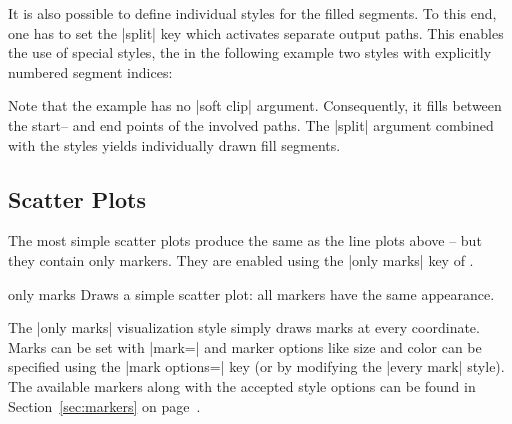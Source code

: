 {{It is also possible to define individual styles for the filled segments. To this end, one has to set the |split| key which activates separate output paths. This enables the use of special styles, the in the following example two styles with explicitly numbered segment indices:
\begin{codeexample}[]
\end{codeexample}
\noindent Note that the example has no |soft clip| argument. Consequently, it fills between the start-- and end points of the involved paths. The |split| argument combined with the styles yields individually drawn fill segments.


}


\subsection{Scatter Plots}
\label{sec:pgfplots:scatter:2d}
The most simple scatter plots produce the same as the line plots above -- but they contain only markers. They are enabled using the |only marks| key of \Tikz.
\begin{plottype}{only marks}
Draws a simple scatter plot: all markers have the same appearance.
\begin{codeexample}[]
\end{codeexample}
	The |only marks| visualization style simply draws marks at every coordinate. Marks can be set with |mark=| and marker options like size and color can be specified using the |mark options=| key (or by modifying the |every mark| style). The available markers along with the accepted style options can be found in Section~\ref{sec:markers} on page~\pageref{sec:markers}.
\end{plottype}

}
